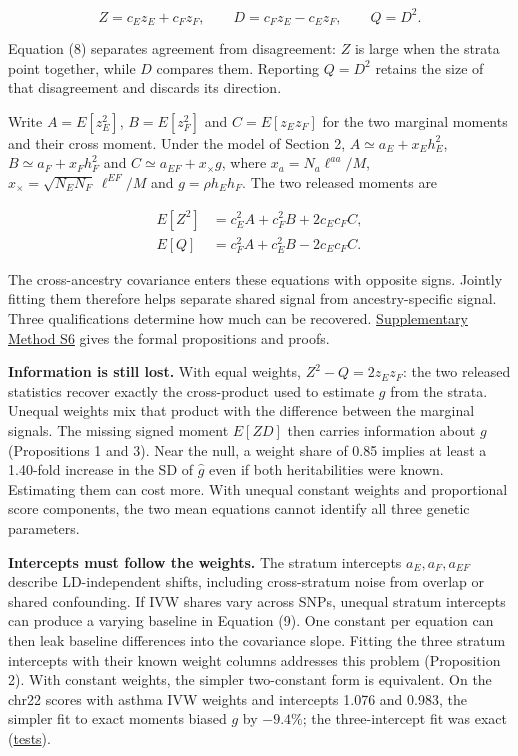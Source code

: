 \documentclass[11pt,a4paper]{article}
\begin{document}
\[
Z=c_Ez_E+c_Fz_F,\qquad D=c_Fz_E-c_Ez_F,\qquad Q=D^2. \tag{8}
\]

Equation (8) separates agreement from disagreement: \(Z\) is large when the strata point together, while \(D\) compares them. Reporting \(Q=D^2\) retains the size of that disagreement and discards its direction.

Write \(A=E[z_E^2]\), \(B=E[z_F^2]\) and \(C=E[z_Ez_F]\) for the two marginal moments and their cross moment. Under the model of Section 2, \(A\simeq a_E+x_Eh_E^2\), \(B\simeq a_F+x_Fh_F^2\) and \(C\simeq a_{EF}+x_\times g\), where \(x_a=N_a\ell^{aa}/M\), \(x_\times=\sqrt{N_EN_F}\,\ell^{EF}/M\) and \(g=\rho h_Eh_F\). The two released moments are

\[
\begin{aligned}
E[Z^2]&=c_E^2A+c_F^2B+2c_Ec_FC,\\
E[Q]&=c_F^2A+c_E^2B-2c_Ec_FC.
\end{aligned}\tag{9}
\]

The cross-ancestry covariance enters these equations with opposite signs. Jointly fitting them therefore helps separate shared signal from ancestry-specific signal. Three qualifications determine how much can be recovered. \hyperref[s6-what-cochrans-q-keeps-and-discards]{Supplementary Method S6} gives the formal propositions and proofs.

\textbf{Information is still lost.} With equal weights, \(Z^2-Q=2z_Ez_F\): the two released statistics recover exactly the cross-product used to estimate \(g\) from the strata. Unequal weights mix that product with the difference between the marginal signals. The missing signed moment \(E[ZD]\) then carries information about \(g\) (Propositions 1 and 3). Near the null, a weight share of 0.85 implies at least a 1.40-fold increase in the SD of \(\hat g\) even if both heritabilities were known. Estimating them can cost more. With unequal constant weights and proportional score components, the two mean equations cannot identify all three genetic parameters.

\textbf{Intercepts must follow the weights.} The stratum intercepts \(a_E,a_F,a_{EF}\) describe LD-independent shifts, including cross-stratum noise from overlap or shared confounding. If IVW shares vary across SNPs, unequal stratum intercepts can produce a varying baseline in Equation (9). One constant per equation can then leak baseline differences into the covariance slope. Fitting the three stratum intercepts with their known weight columns addresses this problem (Proposition 2). With constant weights, the simpler two-constant form is equivalent. On the chr22 scores with asthma IVW weights and intercepts 1.076 and 0.983, the simpler fit to exact moments biased \(g\) by \(-9.4\%\); the three-intercept fit was exact (\href{../tests/test_q_heterogeneity.py}{tests}).
\end{document}
